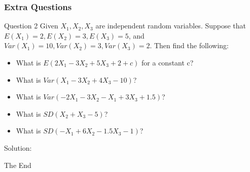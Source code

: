 \documentclass{beamer}
\begin{document}

\begin{frame}
\frametitle{Extra Questions}
\begin{block}{Question 2}
Given $X_1, X_2, X_3$ are independent random variables. Suppose that $E(X_1) = 2, E(X_2) = 3, E(X_3) = 5$, and $Var(X_1) = 10, Var(X_2) = 3, Var(X_3) = 2$. Then find the following:
\begin{itemize}
\item What is $E(2X_1 - 3X_2 + 5X_3 +2 + c)$ for a constant c?
\item What is $Var(X_1 - 3X_2 + 4X_3 - 10)$?
\item What is $Var(-2X_1 - 3X_2 - X_1 + 3X_3 + 1.5)$?
\item What is $SD(X_2 + X_3 -5)$?
\item What is $SD(-X_1 + 6X_2 - 1.5 X_3 -1)$?
\end{itemize}
\end{block}

\begin{block}{Solution:}

\end{block}


\end{frame}


\begin{frame}
\Huge{\centerline{The End}}
\end{frame}

\end{document}
